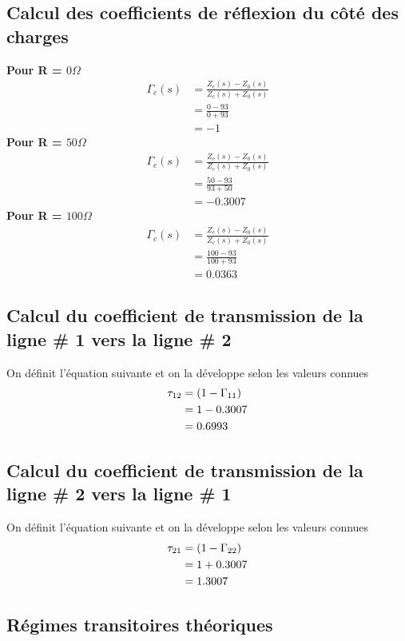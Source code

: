 \subsection{Calcul des coefficients de réflexion du côté des charges}
\textbf{Pour R = $0\Omega$}
\begin{align*}
\Gamma_c (s) &= \frac{Z_c(s) - Z_0(s)}{Z_c(s) + Z_0(s)}\\
			 &= \frac{0 - 93 }{0 + 93}\\
			 &= -1
\end{align*}
\textbf{Pour R = $50\Omega$}
\begin{align*}
\Gamma_c (s) &= \frac{Z_c(s) - Z_0(s)}{Z_c(s) + Z_0(s)}\\
			 &= \frac{50 - 93 }{93 + 50}\\
			 &= -0.3007
\end{align*}
\textbf{Pour R = $100\Omega$}
\begin{align*}
\Gamma_c (s) &= \frac{Z_c(s) - Z_0(s)}{Z_c(s) + Z_0(s)}\\
			 &= \frac{100 - 93 }{100 + 93}\\
			 &= 0.0363
\end{align*}
\subsection{Calcul du coefficient de transmission de la ligne \# 1 vers la ligne \# 2}
On définit l'équation suivante et on la développe selon les valeurs connues
\begin{align}
\tau_{12} &= (1-\Gamma_{11})\\
			&= 1 - 0.3007\notag\\
			&= 0.6993\notag
\end{align}
\subsection{Calcul du coefficient de transmission de la ligne \# 2 vers la ligne \# 1}
On définit l'équation suivante et on la développe selon les valeurs connues
\begin{align}
\tau_{21} &= (1-\Gamma_{22})\\
			&= 1 + 0.3007\notag\\
			&= 1.3007\notag
\end{align}
\subsection{Régimes transitoires théoriques }

